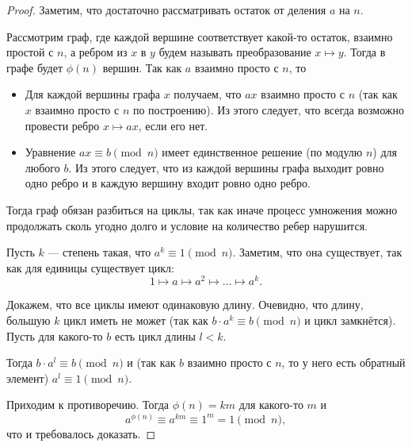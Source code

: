 \documentclass[a4paper]{article}
\theoremstyle{named}
\begin{document}
\begin{colloq}
        \begin{proof}
            Заметим, что достаточно рассматривать остаток от деления $a$ на $n$.

            Рассмотрим граф, где каждой вершине соответствует какой-то остаток, взаимно простой с $n$, а ребром из $x$ в $y$ будем называть преобразование $x \mapsto y$. Тогда в графе будет $\phi(n)$ вершин. Так как $a$ взаимно просто с $n$, то
            \begin{itemize}
            \item
                Для каждой вершины графа $x$ получаем, что $ax$ взаимно просто с $n$ (так как $x$ взаимно просто с $n$ по построению). Из этого следует, что всегда возможно провести ребро $x \mapsto ax$, если его нет.

            \item
                Уравнение $ax \equiv b \pmod n$ имеет единственное решение (по модулю $n$) для любого $b$. Из этого следует, что из каждой вершины графа выходит ровно одно ребро и в каждую вершину входит ровно одно ребро.
            \end{itemize}

            Тогда граф обязан разбиться на циклы, так как иначе процесс умножения можно продолжать сколь угодно долго и условие на количество ребер нарушится. 
            
            Пусть $k$ --- степень такая, что $a^k \equiv 1 \pmod n$. Заметим, что она существует, так как для единицы существует цикл:
            \begin{equation*}
                1 \mapsto a \mapsto a^2 \mapsto \dots \mapsto a^k.
            \end{equation*}

            Докажем, что все циклы имеют одинаковую длину. Очевидно, что длину, большую $k$ цикл иметь не может (так как $b \cdot a^k \equiv b \pmod n$ и цикл замкнётся). Пусть для какого-то $b$ есть цикл длины $l < k$.

            Тогда $b \cdot a^l \equiv b \pmod n$ и (так как $b$ взаимно просто с $n$, то у него есть обратный элемент) $a^l \equiv 1 \pmod n$.

            Приходим к противоречию. Тогда $\phi(n) = km$ для какого-то $m$ и
            \begin{equation*}
                a^{\phi(n)} \equiv a^{km} \equiv 1^m = 1 \pmod n,
            \end{equation*}
            что и требовалось доказать.
        \end{proof}


\end{colloq}
\end{document}
